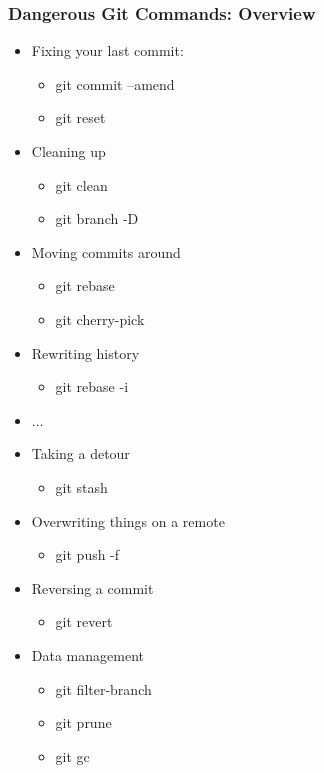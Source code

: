 \begin{frame}[fragile]
\frametitle{Dangerous Git Commands: Overview}
\begin{itemize}
\item Fixing your last commit:
\begin{itemize}
\item git commit --amend
\item git reset
\end{itemize}
\item Cleaning up
\begin{itemize}
\item git clean
\item git branch -D
\end{itemize}
\item Moving commits around
\begin{itemize}
\item git rebase
\item git cherry-pick
\end{itemize}
\item Rewriting history
\begin{itemize}
\item git rebase -i
\end{itemize}
\item ...
\end{itemize}
\end{frame}

\begin{frame}[fragile]
\begin{itemize}
\item Taking a detour
\begin{itemize}
\item git stash
\end{itemize}
\item Overwriting things on a remote
\begin{itemize}
\item git push -f
\end{itemize}
\item Reversing a commit
\begin{itemize}
\item git revert
\end{itemize}
\item Data management
\begin{itemize}
\item git filter-branch
\item git prune
\item git gc
\end{itemize}
\end{itemize}
\end{frame}

